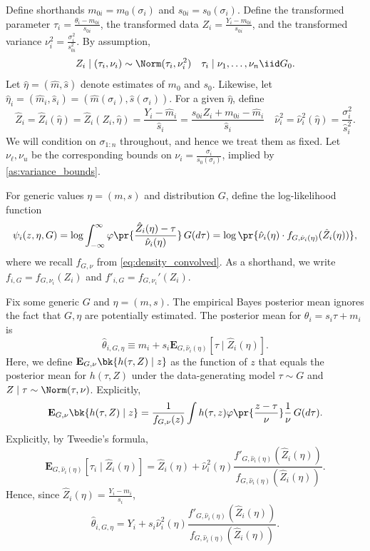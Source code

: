 \documentclass[12pt, reqno]{amsart}
\newcommand{\hatm}{\hat m}
\newcommand{\hats}{\hat s}
\newcommand{\hateta}{\hat\eta}
\newcommand{\PE}{\mathbf{E}}
\numberwithin{equation}{section}
\begin{document}
\begin{refsection}
\begin{appendices}
Define shorthands $m_{0i} = m_0(\sigma_i)$ and $s_{0i} = s_0(\sigma_i)$. Define the
transformed parameter $\tau_i = \frac{\theta_i - m_{0i}}{s_{0i}}$, the transformed data
$Z_i = \frac{Y_i - m_{0i}}{s_{0i}}$, and the transformed variance $\nu_i^2 =
\frac{\sigma_i^2}{s_{0i}^2}$. By assumption, \[ Z_i \mid (\tau_i, \nu_i) \sim
\Norm(\tau_i, \nu_i^2) \quad \tau_i \mid \nu_1,\ldots, \nu_n
\iid G_0.
\]
Let $\hateta = (\hatm, \hats)$ denote estimates of $m_0$ and $s_0$. Likewise, let
$\hateta_i = (\hatm_i, \hats_i) = (\hatm(\sigma_i), \hats(\sigma_i))$. For a given
$\hateta$, define \[
\hat Z_i = \hat Z_i(\hateta) = \hat Z_i(Z_i, \hateta) = \frac{Y_i -
\hatm_i}{\hats_i} = \frac{s_{0i} Z_i + m_{0i}
- \hatm_i}{\hats_i} \quad \hat\nu_i^2 = \hat\nu_i^2(\hateta) = \frac{\sigma_i^2}
{\hats_i^2}.
\]
We will condition on $\sigma_{1:n}$ throughout, and hence we treat them as fixed. Let $\nu_\ell, \nu_u$ be the corresponding bounds on $\nu_i = \frac{\sigma_i}{s_0(\sigma_i)}$, implied by \cref{as:variance_bounds}. 



For generic values $\eta = (m,s)$ and
distribution $G$,  define the log-likelihood function \[
\psi_i(z,\eta, G) = \log \int_{-\infty}^{\infty} \varphi\pr{
\frac{\hat Z_i(\eta) -
\tau}{\hat\nu_i(\eta)}} \,G(d\tau) = \log \pr{\hat\nu_i(\eta) \cdot f_{G, \hat\nu_i
(\eta)}(\hat Z_i(\eta))},
\]
where we recall $f_{G,\nu}$ from \eqref{eq:density_convolved}. As
a shorthand, we write $f_{i, G} = f_{G, \nu_i}(Z_i)$ and $f'_{i,G} = f_{G, \nu_i}' (Z_i)$.





Fix some generic $G$ and $\eta = (m,s)$. The empirical Bayes posterior mean ignores
the fact that $G, \eta$ are potentially estimated. The posterior mean for $
\theta_i = s_i \tau + m_i
$
is \[
\hat \theta_{i, G, \eta} \equiv m_i + s_i \PE_{G, \hat\nu_i(\eta)}[\tau \mid
\hat Z_i(\eta)].
\]
Here, we define $\PE_{G, \nu}\bk{h(\tau, Z) \mid z}$ as the function of
$z$ that
equals the posterior mean for $h(\tau, Z)$ under the data-generating model $\tau \sim G$
and $Z \mid \tau \sim \Norm(\tau, \nu)$. Explicitly, \[
\PE_{G, \nu}\bk{h(\tau, Z) \mid z} = \frac{1}{f_{G, \nu} (z)} \int h(\tau, z)
\varphi\pr{
    \frac{z-\tau}{\nu}
}\frac{1}{\nu}\, G(d\tau).
\]
Explicitly, by Tweedie's formula, \[
\PE_{G, \hat \nu_i(\eta)}[\tau_i \mid \hat Z_i(\eta)] = \hat Z_i(\eta) +
\hat\nu_i^2(\eta) \frac{ f'_
{G, \hat\nu_i(\eta)}(\hat Z_i(\eta))}{f_
{G, \hat\nu_i(\eta)}(\hat Z_i(\eta))}.
\]
Hence, since $\hat Z_i(\eta) = \frac{Y_i - m_i}{s_i}$, \[
\hat \theta_{i, G, \eta} = Y_i + s_i \hat\nu_i^2(\eta) \frac{ f'_
{G, \hat\nu_i(\eta)}(\hat Z_i(\eta))}{f_
{G, \hat\nu_i(\eta)}(\hat Z_i(\eta))}.
\] 


\end{appendices}
\end{refsection}
\end{document}
